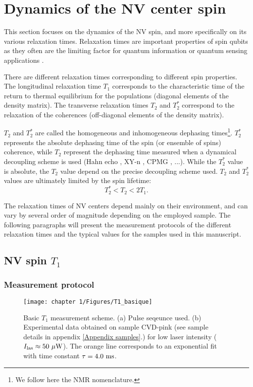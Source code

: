 \documentclass[a4paper, 11pt]{report}
\begin{document}
\section{Dynamics of the NV center spin}

This section focuses on the dynamics of the NV spin, and more specifically on its various relaxation times. Relaxation times are important properties of spin qubits as they often are the limiting factor for quantum information or quantum sensing applications \citep{de2021materials, degen2017quantum}.

There are different relaxation times corresponding to different spin properties. The longitudinal relaxation time $T_1$ corresponds to the characteristic time of the return to thermal equilibrium for the populations (diagonal elements of the density matrix). The transverse relaxation times $T_2$ and $T_2^*$ correspond to the relaxation of the coherences (off-diagonal elements of the density matrix).

$T_2$ and $T_2^*$ are called the homogeneous and inhomogeneous dephasing times\footnote{We follow here the NMR nomenclature.}. $T_2^*$ represents the absolute dephasing time of the spin (or ensemble of spins) coherence, while $T_2$ represent the dephasing time measured when a dynamical decoupling scheme is used (Hahn echo \citep{hahn1950spin}, XY-n \citep{maudsley1986modified}, CPMG \citep{carr1954effects} , ...). While the $T_2^*$ value is absolute, the $T_2$ value depend on the precise decoupling scheme used. $T_2$ and $T_2^*$ values are ultimately limited by the spin lifetime:
\begin{equation}
T_2^* < T_2 < 2 T_1.
\end{equation}

The relaxation times of NV centers depend mainly on their environment, and can vary by several order of magnitude depending on the employed sample. The following paragraphs will present the measurement protocols of the different relaxation times and the typical values for the samples used in this manuscript.

\subsection{NV spin $T_1$}
\label{sec T1 NV}
\subsubsection{Measurement protocol}
\begin{figure}[h!]
\centering
\texttt{[image: chapter 1/Figures/T1\_basique]}
\caption{Basic $T_1$ measurement scheme. (a) Pulse seqeunce used. (b) Experimental data obtained on sample CVD-pink (see sample details in appendix \ref{Appendix samples}.) for low laser intensity ($I_{\rm las} \approx 50\ \mu\rm W$). The orange line corresponds to an exponential fit with time constant $\tau=4.0\ \rm ms$.}
\label{T1 basique}
\end{figure}
\end{document}
